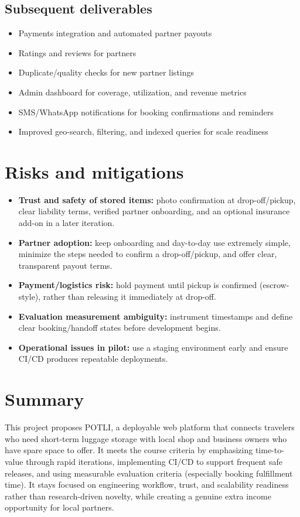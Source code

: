 \documentclass[11pt,a4paper]{article}
\begin{document}
\subsection{Subsequent deliverables}
\begin{itemize}[leftmargin=0.7cm]
    \item Payments integration and automated partner payouts
    \item Ratings and reviews for partners
    \item Duplicate/quality checks for new partner listings
    \item Admin dashboard for coverage, utilization, and revenue metrics
    \item SMS/WhatsApp notifications for booking confirmations and reminders
    \item Improved geo-search, filtering, and indexed queries for scale readiness
\end{itemize}

\section{Risks and mitigations}
\begin{itemize}[leftmargin=0.7cm]
    \item \textbf{Trust and safety of stored items:} photo confirmation at drop-off/pickup, clear liability terms, verified partner onboarding, and an optional insurance add-on in a later iteration.
    \item \textbf{Partner adoption:} keep onboarding and day-to-day use extremely simple, minimize the steps needed to confirm a drop-off/pickup, and offer clear, transparent payout terms.
    \item \textbf{Payment/logistics risk:} hold payment until pickup is confirmed (escrow-style), rather than releasing it immediately at drop-off.
    \item \textbf{Evaluation measurement ambiguity:} instrument timestamps and define clear booking/handoff states before development begins.
    \item \textbf{Operational issues in pilot:} use a staging environment early and ensure CI/CD produces repeatable deployments.
\end{itemize}

\section{Summary}
This project proposes POTLI, a deployable web platform that connects
travelers who need short-term luggage storage with local shop and business
owners who have spare space to offer. It meets the course criteria by
emphasizing time-to-value through rapid iterations, implementing CI/CD to
support frequent safe releases, and using measurable evaluation criteria
(especially booking fulfillment time). It stays focused on engineering
workflow, trust, and scalability readiness rather than research-driven
novelty, while creating a genuine extra income opportunity for local
partners.
\end{document}
